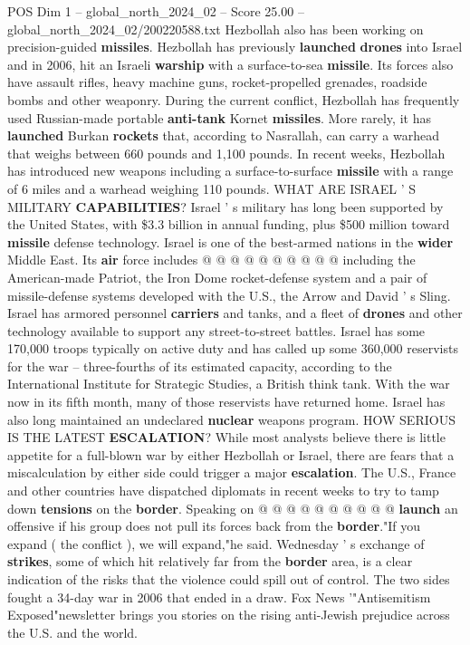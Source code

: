 \begin{textsample}{POS Dim 1 – global\_north\_2024\_02 – Score 25.00 – global\_north\_2024\_02/200220588.txt}
Hezbollah also has been working on precision-guided \textbf{missiles}.
Hezbollah has previously \textbf{launched} \textbf{drones} into Israel and in 2006, hit an Israeli \textbf{warship} with a surface-to-sea \textbf{missile}.
Its forces also have assault rifles, heavy machine guns, rocket-propelled grenades, roadside bombs and other weaponry.
During the current conflict, Hezbollah has frequently used Russian-made portable \textbf{anti-tank} Kornet \textbf{missiles}.
More rarely, it has \textbf{launched} Burkan \textbf{rockets} that, according to Nasrallah, can carry a warhead that weighs between 660 pounds and 1,100 pounds.
In recent weeks, Hezbollah has introduced new weapons including a surface-to-surface \textbf{missile} with a range of 6 miles and a warhead weighing 110 pounds.
WHAT ARE ISRAEL ' S MILITARY \textbf{CAPABILITIES}?
Israel ' s military has long been supported by the United States, with \$3.3 billion in annual funding, plus \$500 million toward \textbf{missile} defense technology.
Israel is one of the best-armed nations in the \textbf{wider} Middle East.
Its \textbf{air} force includes @ @ @ @ @ @ @ @ @ @ including the American-made Patriot, the Iron Dome rocket-defense system and a pair of missile-defense systems developed with the U.S., the Arrow and David ' s Sling.
Israel has armored personnel \textbf{carriers} and tanks, and a fleet of \textbf{drones} and other technology available to support any street-to-street battles.
Israel has some 170,000 troops typically on active duty and has called up some 360,000 reservists for the war -- three-fourths of its estimated capacity, according to the International Institute for Strategic Studies, a British think tank.
With the war now in its fifth month, many of those reservists have returned home.
Israel has also long maintained an undeclared \textbf{nuclear} weapons program.
HOW SERIOUS IS THE LATEST \textbf{ESCALATION}?
While most analysts believe there is little appetite for a full-blown war by either Hezbollah or Israel, there are fears that a miscalculation by either side could trigger a major \textbf{escalation}.
The U.S., France and other countries have dispatched diplomats in recent weeks to try to tamp down \textbf{tensions} on the \textbf{border}.
Speaking on @ @ @ @ @ @ @ @ @ @ \textbf{launch} an offensive if his group does not pull its forces back from the \textbf{border}."If you expand ( the conflict ), we will expand,"he said.
Wednesday ' s exchange of \textbf{strikes}, some of which hit relatively far from the \textbf{border} area, is a clear indication of the risks that the violence could spill out of control.
The two sides fought a 34-day war in 2006 that ended in a draw.
Fox News '"Antisemitism Exposed"newsletter brings you stories on the rising anti-Jewish prejudice across the U.S. and the world.

\end{textsample}
